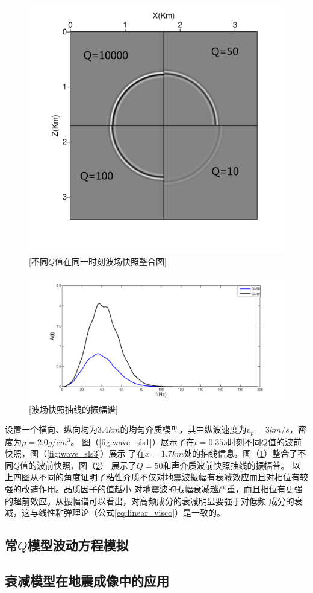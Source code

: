 \begin{figure}[!htbp]
	    \centering
		\includegraphics[width=0.5\linewidth]{figure/wave_sls2}
		[不同$Q$值在同一时刻波场快照整合图]
		\label{fig:wave_sls2}
\end{figure}
\begin{figure}[!htbp]
	    \centering
		\includegraphics[width=0.7\linewidth]{figure/wave_sls4}
		[波场快照抽线的振幅谱]
		\label{fig:wave_sls4}
\end{figure}
设置一个横向、纵向均为$3.4km$的均匀介质模型，其中纵波速度为$v_p=3km/s$，密度为$\rho=2.0g/cm^3$。
图（\ref{fig:wave_sls1}）展示了在$t=0.35s$时刻不同$Q$值的波前快照，图（\ref{fig:wave_sls3}）展示
了在$x=1.7km$处的抽线信息，图（\ref{fig:wave_sls2}）整合了不同$Q$值的波前快照，图（\ref{fig:wave_sls4}）
展示了$Q=50$和声介质波前快照抽线的振幅普。
以上四图从不同的角度证明了粘性介质不仅对地震波振幅有衰减效应而且对相位有较强的改造作用。品质因子的值越小
对地震波的振幅衰减越严重，而且相位有更强的超前效应。从振幅谱可以看出，对高频成分的衰减明显要强于对低频
成分的衰减，这与线性粘弹理论（公式\ref{eq:linear_visco}）是一致的。



\vspace{0.5cm}
\subsection{常$Q$模型波动方程模拟}
\vspace{0.5cm}
\subsection{衰减模型在地震成像中的应用}

